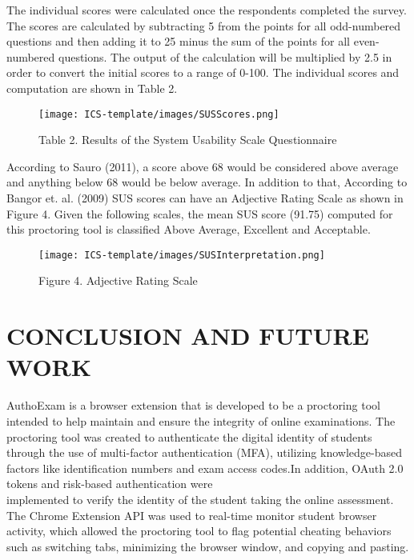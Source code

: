\documentclass{icsthesis}
\begin{document}
\begin{mainmatter}
The individual scores were calculated once the respondents completed the survey. The scores are calculated by subtracting 5 from the points for all odd-numbered questions and then adding it to 25 minus the sum of the points for all even-numbered questions. The output of the calculation will be multiplied by 2.5 in order to convert the initial scores to a range of 0-100. The individual scores and computation are shown in Table 2.

 \begin{figure}[h]
                \centering
                \texttt{[image: ICS-template/images/SUSScores.png]}
                \captionsetup{labelformat=empty}
                \caption{Table 2. Results of the System Usability Scale Questionnaire}
                \label{Table 2: Results of the System Usability Scale Questionnaire}
\end{figure}

According to Sauro (2011), a score above 68 would be considered above average and anything below 68 would be below average. In addition to that, According to Bangor et. al. (2009)  SUS scores can have an Adjective Rating Scale as shown in Figure 4. Given the following scales, the mean SUS score (91.75) computed for this proctoring tool is classified Above Average, Excellent and Acceptable.
\begin{figure}[h]
                \centering
                \texttt{[image: ICS-template/images/SUSInterpretation.png]}
                \captionsetup{labelformat=empty}
                \caption{Figure 4. Adjective Rating Scale}
                \label{Figure 4: Adjective Rating Scale}
\end{figure}
			
\section{CONCLUSION AND FUTURE WORK}
			AuthoExam is a browser extension that is developed to be a proctoring tool intended to help maintain and ensure the integrity of online examinations. The proctoring tool was created to authenticate the digital identity of students through the use of multi-factor authentication (MFA), utilizing knowledge-based factors like identification numbers and exam access codes.In addition, OAuth 2.0 tokens and risk-based authentication were \\ implemented to verify the identity of the student taking the online assessment. The Chrome Extension API was used to real-time monitor student browser activity, which allowed the proctoring tool to flag potential cheating behaviors such as switching tabs, minimizing the browser window, and copying and pasting. 
 

\end{mainmatter}
\end{document}
